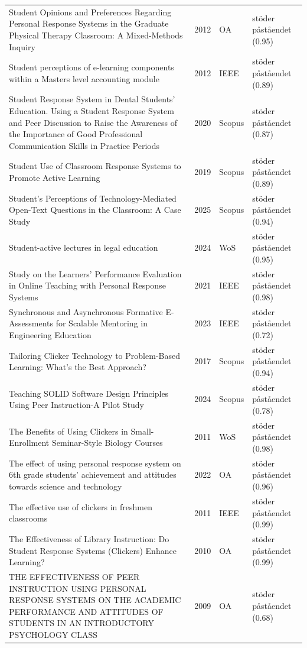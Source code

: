 \begin{longtable}{@{}%
  >{\raggedright\arraybackslash}p{}c%
  >{\raggedright\arraybackslash}p{}%
  >{\raggedright\arraybackslash}p{}@{}}
Student Opinions and Preferences Regarding Personal Response Systems in the Graduate Physical Therapy Classroom: A Mixed-Methods Inquiry & 2012 & OA & stöder påståendet (0.95) \\
Student perceptions of e-learning components within a Masters level accounting module & 2012 & IEEE & stöder påståendet (0.89) \\
Student Response System in Dental Students' Education. Using a Student Response System and Peer Discussion to Raise the Awareness of the Importance of Good Professional Communication Skills in Practice Periods & 2020 & Scopus & stöder påståendet (0.87) \\
Student Use of Classroom Response Systems to Promote Active Learning & 2019 & Scopus & stöder påståendet (0.89) \\
Student's Perceptions of Technology-Mediated Open-Text Questions in the Classroom: A Case Study & 2025 & Scopus & stöder påståendet (0.94) \\
Student-active lectures in legal education & 2024 & WoS & stöder påståendet (0.95) \\
Study on the Learners' Performance Evaluation in Online Teaching with Personal Response Systems & 2021 & IEEE & stöder påståendet (0.98) \\
Synchronous and Asynchronous Formative E-Assessments for Scalable Mentoring in Engineering Education & 2023 & IEEE & stöder påståendet (0.72) \\
Tailoring Clicker Technology to Problem-Based Learning: What's the Best Approach? & 2017 & Scopus & stöder påståendet (0.94) \\
Teaching SOLID Software Design Principles Using Peer Instruction-A Pilot Study & 2024 & Scopus & stöder påståendet (0.78) \\
The Benefits of Using Clickers in Small-Enrollment Seminar-Style Biology Courses & 2011 & WoS & stöder påståendet (0.98) \\
The effect of using personal response system on 6th grade students' achievement and attitudes towards science and technology & 2022 & OA & stöder påståendet (0.96) \\
The effective use of clickers in freshmen classrooms & 2011 & IEEE & stöder påståendet (0.99) \\
The Effectiveness of Library Instruction: Do Student Response Systems (Clickers) Enhance Learning? & 2010 & OA & stöder påståendet (0.99) \\
THE EFFECTIVENESS OF PEER INSTRUCTION USING PERSONAL RESPONSE SYSTEMS ON THE ACADEMIC PERFORMANCE AND ATTITUDES OF STUDENTS IN AN INTRODUCTORY PSYCHOLOGY CLASS & 2009 & OA & stöder påståendet (0.68) \\

\end{longtable}
